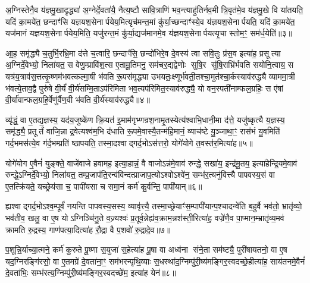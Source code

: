 अ॒ग्निस्तेनै॒व य॑ज्ञमु॒खादृद्ध्या॑ अ॒ग्नेर्दे॒वता॑यै॒ नैत्य॒ष्टौ सा॑वि॒त्राणि॑ भव॒न्त्याहु॑तिर्नव॒मी त्रि॒वृत॑मे॒व य॑ज्ञमु॒खे वि या॑तयति॒ यदि॑ का॒मये॑त॒ छन्दाꣳ॑सि यज्ञयश॒सेनार्पयेय॒मित्यृच॑मन्त॒मां कु॑र्या॒च्छन्दाꣳ॑स्ये॒व य॑ज्ञयश॒सेनार्पयति॒ यदि॑ का॒मये॑त॒ यज॑मानं यज्ञयश॒सेनार्पयेय॒मिति॒ यजु॑रन्त॒मं कु॑र्या॒द्यज॑मानमे॒व य॑ज्ञयश॒सेनार्पयत्यृ॒चा स्तोम॒ꣳ॒ सम॑र्ध॒येति॑॥३॥

आ॒ह॒ समृ॑द्ध्यै च॒तुर्भि॒रभ्रि॒मा द॑त्ते च॒त्वारि॒ छन्दाꣳ॑सि॒ छन्दो॑भिरे॒व दे॒वस्य॑ त्वा सवि॒तुः प्र॑स॒व इत्या॑ह॒ प्रसूत्या अ॒ग्निर्दे॒वेभ्यो॒ निला॑यत॒ स वेणु॒म्प्रावि॑श॒त्स ए॒तामू॒तिमनु॒ सम॑चर॒द्यद्वेणोः सुषि॒र सु॑षि॒राभ्रि॑र्भवति सयोनि॒त्वाय॒ स यत्र॑य॒त्राव॑स॒त्तत्कृ॒ष्णम॑भवत्कल्मा॒षी भ॑वति रू॒पस॑मृद्ध्या उभयतः॒क्ष्णूर्भ॑वती॒तश्चा॒मुत॑श्चा॒र्कस्याव॑रुद्ध्यै व्याममा॒त्री भ॑वत्ये॒ताव॒द्वै पुरु॑षे वी॒र्यं॑ वी॒र्य॑सम्मि॒ताऽप॑रिमिता भव॒त्यप॑रिमित॒स्याव॑रुद्ध्यै॒ यो वन॒स्पती॑नाम्फल॒ग्रहिः॒ स ए॑षां वी॒र्या॑वान्फल॒ग्रहि॒र्वेणु॑र्वैण॒वी भ॑वति वी॒र्य॑स्याव॑रुद्ध्यै॥४॥

{\anuvakamend[{का॒मये॑त गाय॒त्रोऽर्ध॒येति॑ च स॒प्तविꣳ॑शतिश्च॥१॥}]}

व्यृ॑द्धं॒ वा ए॒तद्य॒ज्ञस्य॒ यद॑य॒जुष्के॑ण क्रि॒यत॑ इ॒माम॑गृभ्णन्रश॒नामृ॒तस्येत्य॑श्वाभि॒धानी॒मा द॑त्ते॒ यजु॑ष्कृत्यै य॒ज्ञस्य॒ समृ॑द्ध्यै॒ प्रतूर्तं वाजि॒न्ना द्र॒वेत्यश्व॑म॒भि द॑धाति रू॒पमे॒वास्यै॒तन्म॑हि॒मानं॒ व्याच॑ष्टे यु॒ञ्जाथा॒ꣳ॒ रास॑भं यु॒वमिति॑ गर्द॒भमस॑त्ये॒व ग॑र्द॒भम्प्रति॑ ष्ठापयति॒ तस्मा॒दश्वाद्गर्द॒भोऽस॑त्तरो॒ योगे॑योगे त॒वस्त॑र॒मित्या॑ह॥५॥

योगे॑योग ए॒वैनं॑ युङ्क्ते॒ वाजे॑वाजे हवामह॒ इत्या॒हान्नं॒ वै वाजोऽन्न॑मे॒वाव॑ रुन्द्धे॒ सखा॑य॒ इन्द्र॑मू॒तय॒ इत्या॑हेन्द्रि॒यमे॒वाव॑ रुन्द्धे॒ऽग्निर्दे॒वेभ्यो॒ निला॑यत॒ तम्प्र॒जाप॑ति॒रन्व॑विन्दत्प्राजाप॒त्योऽश्वोऽश्वे॑न॒ सम्भ॑र॒त्यनु॑वित्त्यै पापवस्य॒सं वा ए॒तत्क्रि॑यते॒ यच्छ्रेय॑सा च॒ पापी॑यसा च समा॒नं कर्म॑ कु॒र्वन्ति॒ पापी॑यान्॥६॥

ह्यश्वाद्गर्द॒भोऽश्व॒म्पूर्वं॑ नयन्ति पापवस्य॒सस्य॒ व्यावृ॑त्त्यै॒ तस्मा॒च्छ्रेयाꣳ॑स॒म्पापी॑यान्प॒श्चादन्वे॑ति ब॒हुर्वै भव॑तो॒ भ्रातृ॑व्यो॒ भव॑तीव॒ खलु॒ वा ए॒ष योऽग्निञ्चि॑नु॒ते व॒ज्र्यश्वः॑ प्र॒तूर्व॒न्नेह्य॑व॒क्राम॒न्नश॑स्ती॒रित्या॑ह॒ वज्रे॑णै॒व पा॒प्मान॒म्भ्रातृ॑व्य॒मव॑ क्रामति रु॒द्रस्य॒ गाण॑पत्या॒दित्या॑ह रौ॒द्रा वै प॒शवो॑ रु॒द्रादे॒व॥७॥

प॒शून्नि॒र्याच्या॒त्मने॒ कर्म॑ कुरुते पू॒ष्णा स॒युजा॑ स॒हेत्या॑ह पू॒षा वा अध्व॑ना संने॒ता सम॑ष्ट्यै॒ पुरी॑षायतनो॒ वा ए॒ष यद॒ग्निरङ्गि॑रसो॒ वा ए॒तमग्रे॑ दे॒वता॑ना॒ꣳ॒ सम॑भरन्पृथि॒व्याः स॒धस्था॑द॒ग्निम्पु॑री॒ष्य॑मङ्गिर॒स्वदच्छे॒हीत्या॑ह॒ साय॑तनमे॒वैनं॑ दे॒वता॑भिः॒ सम्भ॑रत्य॒ग्निम्पु॑री॒ष्य॑मङ्गिर॒स्वदच्छे॑म॒ इत्या॑ह येन॑॥८॥

